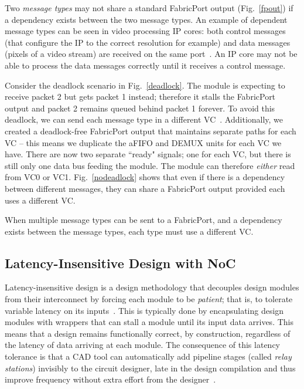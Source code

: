 Two \textit{message types} may not share a standard FabricPort output (Fig.~\ref{fpout}) if a dependency exists between the two message types.
An example of dependent message types can be seen in video processing IP cores: both control messages (that configure the IP to the correct resolution for example) and data messages (pixels of a video stream) are received on the same port~\cite{altera_vip}.
An IP core may not be able to process the data messages correctly until it receives a control message.

Consider the deadlock scenario in Fig.~\ref{deadlock}.
The module is expecting to receive packet 2 but gets packet 1 instead; therefore it stalls the FabricPort output and packet 2 remains queued behind packet 1 forever.
To avoid this deadlock, we can send each message type in a different VC~\cite{Sorin2011}.
Additionally, we created a deadlock-free FabricPort output that maintains separate paths for each VC -- this means we duplicate the aFIFO and DEMUX units for each VC we have.
There are now two separate ``ready" signals; one for each VC, but there is still only one data bus feeding the module. 
The module can therefore \textit{either} read from VC0 or VC1.
Fig.~\ref{nodeadlock} shows that even if there is a dependency between different messages, they can share a FabricPort output provided each uses a different VC.
%
\begin{cond}
When multiple message types can be sent to a FabricPort, and a dependency exists between the message types, each type must use a different VC.
\end{cond}
%

%
\subsection{Latency-Insensitive Design with NoC}
%

Latency-insensitive design is a design methodology that decouples design modules from their interconnect by forcing each module to be \textit{patient}; that is, to tolerate variable latency on its inputs~\cite{Carloni2002}.
This is typically done by encapsulating design modules with wrappers that can stall a module until its input data arrives.
This means that a design remains functionally correct, by construction, regardless of the latency of data arriving at each module.
The consequence of this latency tolerance is that a CAD tool can automatically add pipeline stages (called \textit{relay stations}) invisibly to the circuit designer, late in the design compilation and thus improve frequency without extra effort from the designer~\cite{Carloni2002}.

